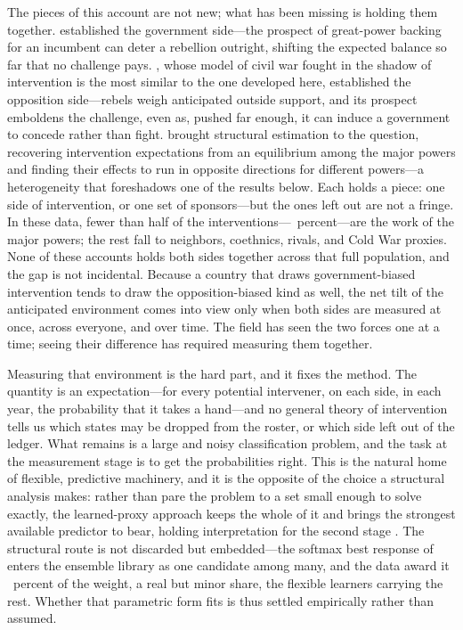 The pieces of this account are not new; what has been missing is holding them
together.  \citet{cunningham2016} established the government side---the
prospect of great-power backing for an incumbent can deter a rebellion
outright, shifting the expected balance so far that no challenge pays.
\citet{lango2023}, whose model of civil war fought in the shadow of
intervention is the most similar to the one developed here, established the
opposition side---rebels weigh anticipated outside support, and its prospect
emboldens the challenge, even as, pushed far enough, it can induce a government
to concede rather than fight.  \citet{gibilisco2022} brought structural
estimation to the question, recovering intervention expectations from an
equilibrium among the major powers and finding their effects to run in opposite
directions for different powers---a heterogeneity that foreshadows one of the
results below.  Each holds a piece: one side of intervention, or one set of
sponsors---but the ones left out are not a fringe.  In these data, fewer than
half of the interventions---\PFivePct\ percent---are the work of the major
powers; the rest fall to neighbors, coethnics, rivals, and Cold War proxies.
None of these accounts holds both sides together across that full population,
and the gap is not incidental.  Because a country that draws government-biased
intervention tends to draw the opposition-biased kind as well, the net tilt of
the anticipated environment comes into view only when both sides are measured
at once, across everyone, and over time.  The field has
seen the two forces one at a time; seeing their difference has required
measuring them together.

Measuring that environment is the hard part, and it fixes the method.  The
quantity is an expectation---for every potential intervener, on each side, in
each year, the probability that it takes a hand---and no general theory of
intervention tells us which states may be dropped from the roster, or which
side left out of the ledger.  What remains is a large and noisy classification problem, and the
task at the measurement stage is to get the probabilities right.  This is the natural home of flexible, predictive
machinery, and it is the opposite of the choice a structural analysis makes:
rather than pare the problem to a set small enough to solve exactly, the
learned-proxy approach keeps the whole of it and brings the strongest available
predictor to bear, holding interpretation for the second stage
\citep{knoxlucascho2022, moruccispirling2024}.  The structural route is not
discarded but embedded---the softmax best response of \citet{gibilisco2022}
enters the ensemble library as one candidate among many, and the data award it
\WtMultinom\ percent of the weight, a real but minor share, the flexible
learners carrying the rest.  Whether that parametric form fits is thus settled
empirically rather than assumed.

